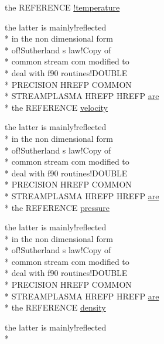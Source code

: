 \begin{DoxyCompactItemize}
the R\-E\-F\-E\-R\-E\-N\-C\-E \hyperlink{streamplasma_8com_a7d361ac8a9f115c00cd252dbfbbd14ff}{!temperature}
\item 
the latter is mainly!reflected \\*
in the non dimensional form \\*
of!\-Sutherland s law!\-Copy of \\*
common stream com modified to \\*
deal with f90 routines!\-D\-O\-U\-B\-L\-E \\*
P\-R\-E\-C\-I\-S\-I\-O\-N H\-R\-E\-F\-P C\-O\-M\-M\-O\-N \\*
S\-T\-R\-E\-A\-M\-P\-L\-A\-S\-M\-A H\-R\-E\-F\-P H\-R\-E\-F\-P \hyperlink{ibc8_8com_a7f7721a0bb3c1d35cfbfbcfd6efc1548}{are} \\*
the R\-E\-F\-E\-R\-E\-N\-C\-E \hyperlink{streamplasma_8com_ae080af58e7f7b09ff8bedbf44df489cc}{velocity}
\item 
the latter is mainly!reflected \\*
in the non dimensional form \\*
of!\-Sutherland s law!\-Copy of \\*
common stream com modified to \\*
deal with f90 routines!\-D\-O\-U\-B\-L\-E \\*
P\-R\-E\-C\-I\-S\-I\-O\-N H\-R\-E\-F\-P C\-O\-M\-M\-O\-N \\*
S\-T\-R\-E\-A\-M\-P\-L\-A\-S\-M\-A H\-R\-E\-F\-P H\-R\-E\-F\-P \hyperlink{ibc8_8com_a7f7721a0bb3c1d35cfbfbcfd6efc1548}{are} \\*
the R\-E\-F\-E\-R\-E\-N\-C\-E \hyperlink{streamplasma_8com_a061f6a0622bc09f6559b154216c21ace}{pressure}
\item 
the latter is mainly!reflected \\*
in the non dimensional form \\*
of!\-Sutherland s law!\-Copy of \\*
common stream com modified to \\*
deal with f90 routines!\-D\-O\-U\-B\-L\-E \\*
P\-R\-E\-C\-I\-S\-I\-O\-N H\-R\-E\-F\-P C\-O\-M\-M\-O\-N \\*
S\-T\-R\-E\-A\-M\-P\-L\-A\-S\-M\-A H\-R\-E\-F\-P H\-R\-E\-F\-P \hyperlink{ibc8_8com_a7f7721a0bb3c1d35cfbfbcfd6efc1548}{are} \\*
the R\-E\-F\-E\-R\-E\-N\-C\-E \hyperlink{streamplasma_8com_aa525a779932d4a5c5b7500c91aa9703a}{density}
\item 
the latter is mainly!reflected \\*

\end{DoxyCompactItemize}
